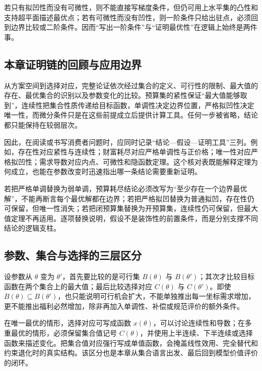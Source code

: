 若只有拟凹性而没有可微性，则不能直接写梯度条件，但仍可用上水平集的凸性和支持超平面描述最优点；若有可微性而没有凹性，则一阶条件只给出驻点，必须回到边界比较或二阶条件。因而“写出一阶条件”与“证明最优性”在逻辑上始终是两件事。

\subsection{本章证明链的回顾与应用边界}
从方案空间到选择对应，完整论证依次经过集合的定义、可行性的限制、最大值的存在、最优集合的识别以及参数变化的比较。预算集的紧性保证“最大值能够取到”，连续性把集合性质传递给目标函数，单调性决定边界位置，严格拟凹性决定唯一性，而微分条件只是在这些前提成立后提供计算工具。任何一步被省略，结论都只能保持在较弱层次。

因此，在阅读或书写消费者问题时，应同时记录“结论—假设—证明工具”三列。例如，存在性对应紧性与连续性；财富耗尽对应严格单调性与正价格；唯一性对应严格拟凹性；需求导数对应内点、可微性和隐函数定理。这个核对表既能解释定理为何成立，也能在参数改变时迅速指出哪一条结论需要重新证明。

\begin{example}[同一模型中的假设替换]
若把严格单调替换为弱单调，预算耗尽结论必须改写为“至少存在一个边界最优解”，不能再断言每个最优解都在边界；若把严格拟凹替换为普通拟凹，存在性仍可保留，但唯一性消失；若把闭预算集替换为开预算集，连续性仍可保留，但最大值定理不再适用。逐项替换说明，假设不是装饰性的前置条件，而是分别支撑不同结论的逻辑支柱。
\end{example}

\subsection{参数、集合与选择的三层区分}
设参数从 $\theta$ 变为 $\theta'$，首先要比较的是可行集 $B(\theta)$ 与 $B(\theta')$；其次才比较目标函数在两个集合上的最大值；最后比较选择对应 $C(\theta)$ 与 $C(\theta')$。即使 $B(\theta)\subseteq B(\theta')$，也只能说明可行机会扩大，不能单独推出每一坐标需求增加，更不能推出福利必然增加，除非再加入单调性、补偿或规范评价的额外条件。

在唯一最优的情形，选择对应可写成函数 $x(\theta)$，可以讨论连续性和导数；在多重最优的情形，必须保留集合值记号 $C(\theta)$，并使用上半连续、下半连续或选择函数来描述变化。把集合值对应强行写成单值函数，会掩盖线性效用、完全替代和约束退化时的真实结构。该区分也是本章从集合语言出发、最后回到模型价值评价的闭环。
